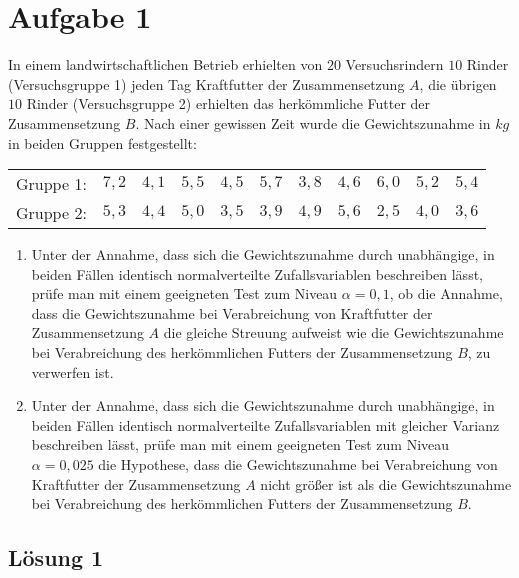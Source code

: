 \documentclass[main.tex]{subfiles}
\begin{document}
\section{Aufgabe 1}
In einem landwirtschaftlichen Betrieb erhielten von $20$ Versuchsrindern $10$ Rinder (Versuchsgruppe 1) jeden Tag Kraftfutter der Zusammensetzung $A$, die übrigen $10$ Rinder (Versuchsgruppe 2) erhielten das herkömmliche Futter der Zusammensetzung $B$. Nach einer gewissen Zeit wurde die Gewichtszunahme in $kg$ in beiden Gruppen festgestellt:
\begin{center}
	\begin{tabular}{ccccccccccc}
		Gruppe 1: & $7,2$ & $4,1$ & $5,5$ & $4,5$ & $5,7$ & $3,8$ & $4,6$ & $6,0$ & $5,2$ & $5,4$ \\
		Gruppe 2: & $5,3$ & $4,4$ & $5,0$ & $3,5$ & $3,9$ & $4,9$ & $5,6$ & $2,5$ & $4,0$ & $3,6$ 
	\end{tabular}
\end{center}
\begin{enumerate}
\item Unter der Annahme, dass sich die Gewichtszunahme durch unabhängige, in beiden Fällen identisch normalverteilte Zufallsvariablen beschreiben lässt, prüfe man mit einem geeigneten Test zum Niveau $\alpha = 0,1$, ob die Annahme, dass die Gewichtszunahme bei Verabreichung von Kraftfutter der Zusammensetzung $A$ die gleiche Streuung aufweist wie die Gewichtszunahme bei Verabreichung des herkömmlichen Futters der Zusammensetzung $B$, zu verwerfen ist.
\item Unter der Annahme, dass sich die Gewichtszunahme durch unabhängige, in beiden Fällen identisch normalverteilte Zufallsvariablen mit gleicher Varianz beschreiben lässt, prüfe man mit einem geeigneten Test zum Niveau $\alpha = 0,025$ die Hypothese, dass die Gewichtszunahme bei Verabreichung von Kraftfutter der Zusammensetzung $A$ nicht größer ist als die Gewichtszunahme bei Verabreichung des herkömmlichen Futters der Zusammensetzung $B$.
\end{enumerate}

\subsection{Lösung 1}
\end{document}
